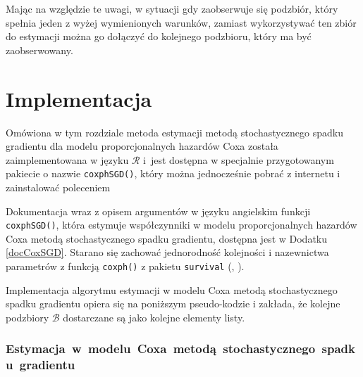 Mając na względzie te uwagi, w sytuacji gdy zaobserwuje się podzbiór, który spełnia jeden z wyżej wymienionych warunków, zamiast wykorzystywać ten zbiór do estymacji można go dołączyć do kolejnego podzbioru, który ma być zaobserwowany.

\newpage
\section{Implementacja}\label{implemento}

Omówiona w tym rozdziale metoda estymacji metodą stochastycznego spadku gradientu dla modelu proporcjonalnych hazardów Coxa została zaimplementowana w języku $\mathcal{R}$ i~jest dostępna w specjalnie przygotowanym pakiecie o nazwie \texttt{coxphSGD()}, który można jednocześnie pobrać z internetu i zainstalować poleceniem
\begin{Shaded}
\begin{Highlighting}[]
\NormalTok{(}\NormalTok{)}
\end{Highlighting}
\end{Shaded}

Dokumentacja wraz z opisem argumentów w języku angielskim funkcji \texttt{coxphSGD()}, która estymuje współczynniki w modelu
proporcjonalnych hazardów Coxa metodą stochastycznego spadku gradientu, dostępna jest w Dodatku \ref{docCoxSGD}.
Starano się zachować jednorodność kolejności i nazewnictwa parametrów z funkcją \texttt{coxph()} z pakietu \texttt{survival} (\cite{ther}, \cite{survival}).

Implementacja algorytmu estymacji w modelu Coxa metodą stochastycznego spadku gradientu opiera się na poniższym pseudo-kodzie i zakłada, że kolejne podzbiory \(\mathcal{B}\) dostarczane są jako kolejne elementy listy.
\subsubsection{Estymacja~w~modelu~Coxa~metodą~stochastycznego~spadku~gradientu}


